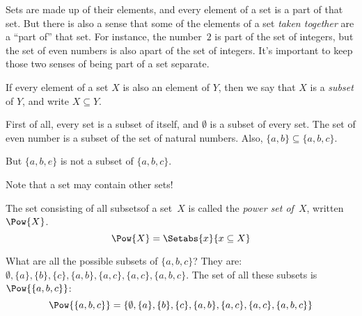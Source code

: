\documentclass[../../include/open-logic-section]{subfiles}
\begin{document}

\begin{wordy}
Sets are made up of their elements, and every element of a set is a
part of that set.  But there is also a sense that some of the elements
of a set \emph{taken together} are a ``part of'' that set. For
instance, the number~$2$ is part of the set of integers, but the set
of even numbers is also apart of the set of integers. It's important
to keep those two senses of being part of a set separate.
\end{wordy}

\begin{defn}
If every element of a set $X$ is also an element of
    $Y$, then we say that $X$ is a \emph{subset} of $Y$, and write $X
    \subseteq Y$.
\end{defn}

\begin{ex}
First of all, every set is a subset of itself, and $\emptyset$ is a
subset of every set. The set of even number is a subset of the set of
natural numbers.  Also, $\{ a, b \} \subseteq \{ a, b, c \}$.

But $\{ a, b, e \}$ is not a subset of $\{ a, b, c \}$.
\end{ex}

\begin{wordy}
Note that a set may contain other sets!  
\end{wordy}


\begin{defn}
The set consisting of all subsetsof a set~$X$ is called the
\emph{power set of}~$X$, written $\Pow{X}$.
    \[\Pow{X} = \Setabs{x}{x \subseteq X} \]
\end{defn}

\begin{ex}
What are all the possible subsets of $\{ a, b, c \}$? They are:
$\emptyset, \{a \}, \{b\}, \{c\}, \{a, b\}, \{a, c\}, \{a, c\}, \{a,
b, c\}$.  The set of all these subsets is $\Pow{\{a,b,c\}}$:
\[
\Pow{\{ a, b, c \}} = \{\emptyset, \{a \}, \{b\}, \{c\}, \{a, b\},
\{a, c\}, \{a, c\}, \{a, b, c\}\}
\]
\end{ex}
\end{document}
